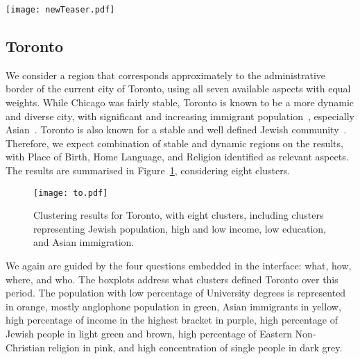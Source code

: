 
\begin{figure*}
    \centering
 \texttt{[image: newTeaser.pdf]}
 \caption{Workflow to discover gentrification in Chicago: the purple cluster
 corresponds to high education / income. Its population is increasing over time,
 absorbing from the majority White cluster (orange). By selecting the purple
 cluster in 2010, the region is highlighted in the maps. The proportion of
 people with 4+ years of college is increasing in the whole city (grey IQRs),
 but significantly more in this region (black).\label{fig:chiWorkflow}}
\end{figure*}



\subsection{Toronto}

We consider a region that corresponds approximately to the administrative border
of the current city of Toronto, using all seven available aspects with equal
weights. While Chicago was fairly stable, Toronto is known to be a more dynamic
and diverse city, with significant and increasing immigrant
population~\citep{hulchanski2007three,Fong2011}, especially
Asian~\citep{Fong2003}. Toronto is also known for a stable and well defined
Jewish community~\citep{Harold2018, Fong2011}. Therefore, we expect 
combination of stable and dynamic regions on the results, with Place of Birth,
Home Language, and Religion identified as relevant aspects. The results are
summarised in Figure~\ref{fig:to}, considering eight clusters.

\begin{figure}
    \centering 
    \texttt{[image: to.pdf]}
    \caption{Clustering results for Toronto, with eight clusters, including
    clusters representing Jewish population, high and low income, low education,
    and Asian immigration.\label{fig:to}}
\end{figure}

We again are guided by the four questions embedded in the interface: what, how,
where, and who. The boxplots address what clusters defined Toronto over this
period. The population with low percentage of University degrees is represented
in orange, mostly anglophone population in green, Asian immigrants in yellow,
high percentage of income in the highest bracket in purple, high percentage of
Jewish people in light green and brown, high percentage of Eastern Non-Christian
religion in pink, and high concentration of single people in dark grey. 

